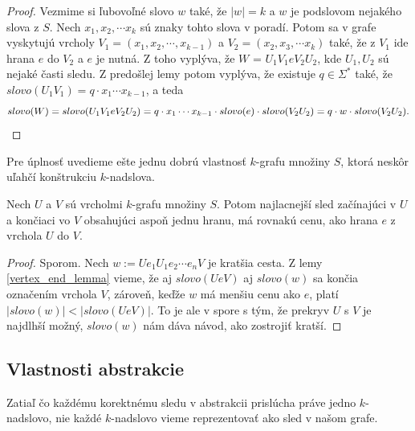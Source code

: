 \begin{proof}
Vezmime si ľubovoľné slovo $w$ také, že $|w| = k$ a $w$ je podslovom nejakého slova z $S$. Nech $x_1, x_2, \cdots x_k$
sú znaky tohto slova v poradí. Potom sa v grafe vyskytujú vrcholy $V_1 = (x_1, x_2, \cdots, x_{k-1})$ a $V_2 = (x_2, x_3, \cdots x_k)$ také,
že z $V_1$ ide hrana $e$ do $V_2$ a $e$ je nutná. Z toho vyplýva, že $W$ = $U_1 V_1 e V_2 U_2$, kde $U_1, U_2$ sú nejaké časti sledu.
Z predošlej lemy potom vyplýva, že existuje $q \in \Sigma^*$ také, že $slovo(U_1 V_1) =  q \cdot x_1 \cdots x_{k - 1}$, a teda
$$slovo(W) = slovo(U_1 V_1 e V_2 U_2) = q \cdot x_1 \cdots x_{k - 1} \cdot slovo(e) \cdot slovo (V_2 U_2) = q \cdot w \cdot slovo(V_2 U_2).\qedhere$$
\end{proof}

Pre úplnosť uvedieme ešte jednu dobrú vlastnosť $k$-grafu množiny $S$, ktorá neskôr uľahčí
konštrukciu $k$-nadslova.

\begin{lema}
\label{shortest_edge_lemma}
    Nech $U$ a $V$ sú vrcholmi $k$-grafu množiny $S$. Potom najlacnejší sled začínajúci v $U$
    a končiaci vo $V$ obsahujúci aspoň jednu hranu, má rovnakú cenu, ako hrana $e$ z vrchola $U$ do $V$.
\end{lema}

\begin{proof}
    Sporom. Nech $w := U e_1 U_1 e_2 \cdots e_n V$ je kratšia cesta. Z lemy \ref{vertex_end_lemma} vieme,
    že aj $slovo(U e V)$ aj $slovo(w)$ sa končia označením vrchola $V$, zároveň, keďže $w$ má
    menšiu cenu ako $e$, platí $|slovo(w)| < |slovo(U e V)|$. To je ale v spore s tým, že prekryv
    $U$ s $V$ je najdlhší možný, $slovo(w)$ nám dáva návod, ako zostrojiť kratší.
\end{proof}

\subsection{Vlastnosti abstrakcie}

Zatiaľ čo každému korektnému sledu v abstrakcii prislúcha práve jedno $k$-nadslovo, nie
každé $k$-nadslovo vieme reprezentovať ako sled v našom grafe.

